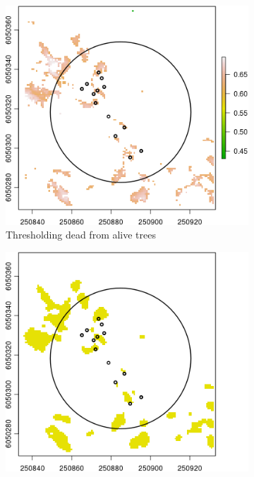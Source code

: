 \documentclass{subfiles}
\begin{document}
  \begin{figure} [h!]			
  	\begin{subfigure}[t]{.49\textwidth}
  		
  		\centering
  		\includegraphics[width=\textwidth]{img/dead/c8_thresDead}
  		\caption{Thresholding dead from alive trees}
  		\label{fig:c8_deadThres}
  	\end{subfigure} \hfill
  	\begin{subfigure}[t]{.49\textwidth}
  		\centering
  		\includegraphics[width=\textwidth]{img/dead/c9_sharpFilter}

\end{subfigure}
\end{figure}
\end{document}
